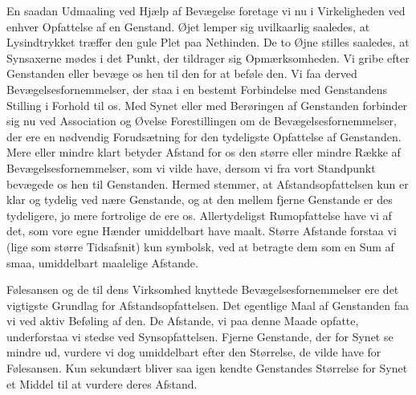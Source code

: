 \documentclass[12pt,a4paper,openany]{book}
\newcommand{\opage}[1]{\marginnote{\footnotesize\textit{[#1]}}}
\begin{document}
En saadan Udmaaling ved Hjælp af Bevægelse foretage vi nu i
Virkeligheden ved enhver Opfattelse af en Genstand. Øjet lemper sig
uvilkaarlig saaledes, at Lysindtrykket træffer den gule Plet paa
Nethinden. De to Øjne stilles saaledes, at Synsaxerne mødes i det Punkt,
der tildrager sig Opmærksomheden. Vi gribe efter Genstanden eller bevæge
os hen til den for at beføle den. Vi faa derved Bevægelsesfornemmelser,
der staa i en bestemt Forbindelse med Genstandens Stilling i Forhold til
os. Med Synet eller med Berøringen af Genstanden forbinder sig nu ved
Association og Øvelse Forestillingen om de Bevægelsesfornemmelser, der
ere en nødvendig Forudsætning for den tydeligste Opfattelse af
Genstanden. Mere eller mindre klart betyder Afstand for os den større
eller mindre Række af Bevægelsesfornemmelser, som vi vilde have, dersom
vi fra vort Standpunkt bevægede os hen til Genstanden. Hermed stemmer,
at Afstandsopfattelsen kun er klar og tydelig ved nære Genstande, og at
den mellem fjerne Genstande er des tydeligere, jo mere fortrolige de ere
os. Allertydeligst Rumopfattelse have vi af det, som vore egne Hænder
umiddelbart have maalt. Større Afstande forstaa vi (lige som større
Tidsafsnit) kun symbolsk, ved at betragte dem som en Sum af smaa,
umiddelbart maalelige Afstande.

Følesansen og de til dens Virksomhed knyttede Bevægelsesfornemmelser ere
det vigtigste Grundlag for Afstandsopfattelsen. Det egentlige Maal af
Genstanden faa vi ved aktiv Beføling
\opage{238}af den. De Afstande, vi paa denne Maade opfatte, underforstaa
vi stedse ved Synsopfattelsen. Fjerne Genstande, der for Synet se mindre
ud, vurdere vi dog umiddelbart efter den Størrelse, de vilde have for
Følesansen. Kun sekundært bliver saa igen kendte Genstandes Størrelse
for Synet et Middel til at vurdere deres Afstand.
\end{document}
